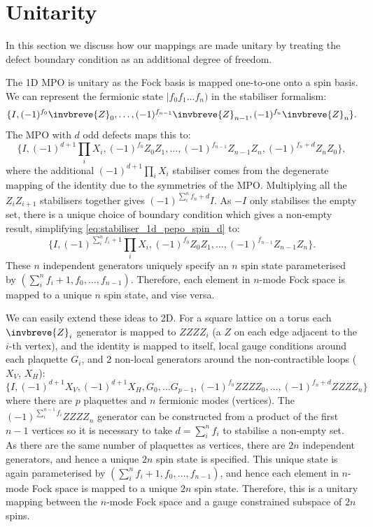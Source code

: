 \section{Unitarity}
In this section we discuss how our mappings are made unitary by treating the defect boundary condition as an additional degree of freedom.

The 1D MPO is unitary as the Fock basis is mapped one-to-one onto a spin basis. We can represent the fermionic state $|f_0f_1\ldots f_n)$ in the stabiliser formalism:
\begin{equation}
    \{I, (-1)^{f_0} \invbreve{Z}_0, \ldots, (-1)^{f_{n-1}}\invbreve{Z}_{n-1}, (-1)^{f_n}\invbreve{Z}_{n}\}.
\end{equation}
The MPO with $d$ odd defects maps this to:
\begin{equation}
    \{I, (-1)^{d+1}\textstyle{\prod_i X_i}, (-1)^{f_0} Z_0Z_1, \ldots, (-1)^{f_{n-1}}Z_{n-1}Z_{n}, (-1)^{f_n+d}Z_{n}Z_0\},
    \label{eq:stabiliser_1d_pepo_spin_d}
\end{equation}
where the additional $(-1)^{d+1}\prod_i X_i$ stabiliser comes from the degenerate mapping of the identity due to the symmetries of the MPO. Multiplying all the $Z_{i}Z_{i+1}$ stabilisers together gives $(-1)^{\sum_i^n f_n + d}I$. As $-I$ only stabilises the empty set, there is a unique choice of boundary condition which gives a non-empty result, simplifying \eqref{eq:stabiliser_1d_pepo_spin_d} to:
\begin{equation}
    \{I, (-1)^{\sum_{i}^{n}f_i+1}\textstyle{\prod_i X_i}, (-1)^{f_0} Z_0Z_1, \ldots, (-1)^{f_{n-1}}Z_{n-1}Z_{n}\}.
    \label{eq:stabiliser_1d_pepo_spin}
\end{equation}
These $n$ independent generators uniquely specify an $n$ spin state parameterised by $(\sum_{i}^{n}f_i+1, f_0,\ldots, f_{n-1})$. Therefore, each element in $n$-mode Fock space is mapped to a unique $n$ spin state, and vise versa.

We can easily extend these ideas to 2D. For a square lattice on a torus each $\invbreve{Z}_i$ generator is mapped to $ZZZZ_i$ (a $Z$ on each edge adjacent to the $i$-th vertex), and the identity is mapped to itself, local gauge conditions around each plaquette $G_i$, and 2 non-local generators around the non-contractible loops ($X_V$, $X_H$):
\begin{equation}
    \{I, (-1)^{d+1}X_V, (-1)^{d+1}X_H,G_0,\ldots G_{p-1}, (-1)^{f_0} ZZZZ_0, \ldots,  (-1)^{f_n+d} ZZZZ_{n}\}
    \label{eq:stabiliser_2d_pepo_spin_d}
\end{equation}
where there are $p$ plaquettes and $n$ fermionic modes (vertices). The $(-1)^{\sum_{i}^{n-1}f_i}ZZZZ_n$ generator can be constructed from a product of the first $n-1$ vertices so it is necessary to take $d = \sum_{i}^{n}f_i$ to stabilise a non-empty set. As there are the same number of plaquettes as vertices, there are $2n$ independent generators, and hence a unique $2n$ spin state is specified. This unique state is again parameterised by $(\sum_{i}^{n}f_i+1, f_0,\ldots, f_{n-1})$, and hence each element in $n$-mode Fock space is mapped to a unique $2n$ spin state. Therefore, this is a unitary mapping between the $n$-mode Fock space and a gauge constrained subspace of $2n$ spins.

